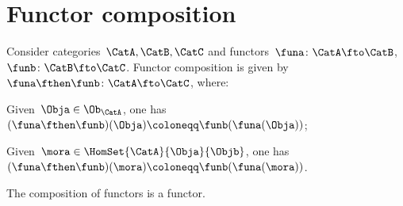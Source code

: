 
\section{Functor composition}

\begin{ctdefinition}
    \label{def:functor_composition}
    Consider categories~$\CatA,\CatB,\CatC$ and functors~$\funa\colon \CatA\fto \CatB$,~$\funb \colon \CatB\fto \CatC$.
    Functor composition is given by~$\funa\fthen \funb\colon \CatA \fto \CatC$, where:
    \begin{compactitem}
        \item Given~$\Obja\in \Ob_\CatA$, one has~$(\funa\fthen \funb)(\Obja)\coloneqq\funb(\funa(\Obja))$;
        \item Given~$\mora \in \HomSet{\CatA}{\Obja}{\Objb}$, one has~$(\funa\fthen \funb)(\mora)\coloneqq \funb(\funa(\mora))$.
    \end{compactitem}
\end{ctdefinition}

\begin{lemma}
    \label{lem:functors_compose}
    The composition of functors is a functor.
\end{lemma}

